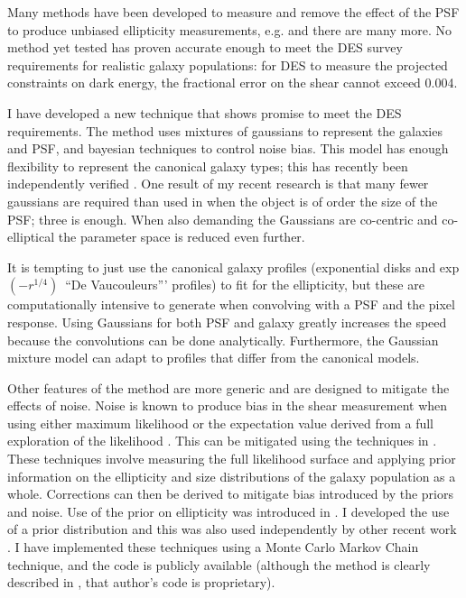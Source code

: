 \documentclass[12pt]{article}
\newcommand{\devauc}{De Vaucouleurs'}
\newcommand{\devprof}{exp$(-r^{1/4})$}
\begin{document}
Many methods have been developed to measure and remove the effect of the PSF to
produce unbiased ellipticity measurements, e.g.
\cite{ksb95,Bern02,Miller07,Melchior11} and there are many more.  No method yet
tested has proven accurate enough to meet the DES survey requirements for
realistic galaxy populations:  for DES to measure the projected constraints on
dark energy, the fractional error on the shear cannot exceed 0.004.

I have developed a new technique that shows promise to meet the DES
requirements.  The method uses mixtures of gaussians to represent the galaxies
and PSF, and bayesian techniques to control noise bias.  This model has enough
flexibility to represent the canonical galaxy types; this has recently been
independently verified \citep{HoggGMix12}.  One result of my recent research is
that many fewer gaussians are required than used in \cite{HoggGMix12} when the
object is of order the size of the PSF; three is enough.  When also demanding
the Gaussians are co-centric and co-elliptical the parameter space is reduced
even further.  

It is tempting to just use the canonical galaxy profiles (exponential disks and
\devprof\ ``\devauc'' profiles) to fit for the ellipticity, but these are
computationally intensive to generate when convolving with a PSF and the pixel
response.  Using Gaussians for both PSF and galaxy greatly increases the speed
because the convolutions can be done analytically.   Furthermore, the Gaussian
mixture model can adapt to profiles that differ from the canonical models.

Other features of the method are more generic and are designed to mitigate the
effects of noise.  Noise is known to produce bias in the shear measurement when
using either maximum likelihood \cite{Refreg12} or the expectation value
derived from a full exploration of the likelihood \cite{Miller12}.  This can be
mitigated using the techniques in \cite{Miller07,Miller12}. These techniques
involve measuring the full likelihood surface and applying prior information on
the ellipticity and size distributions of the galaxy population as a whole.
Corrections can then be derived to mitigate bias introduced by the priors and
noise.  Use of the prior on ellipticity was introduced in \cite{Miller07}. I
developed the use of a prior distribution and this was also used independently
by other recent work \cite{Miller12}.  I have implemented these techniques
using a Monte Carlo Markov Chain technique, and the code is publicly available
(although the method is clearly described in \cite{Miller07}, that author's
code is proprietary).
\end{document}
